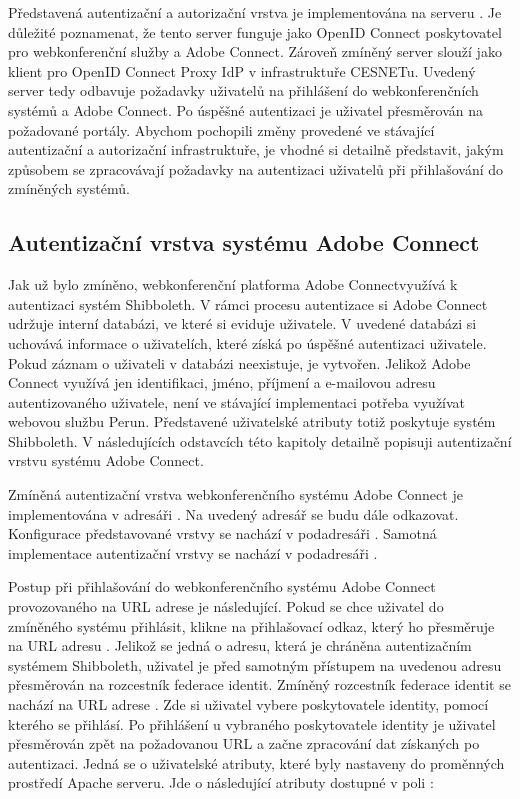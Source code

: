 \documentclass[
  printed, %
  twoside, %
  table,   %
  nolof,     %
  nolot,     %
]{fithesis3}
\begin{document}
Představená autentizační a autorizační vrstva je implementována na serveru . Je důležité poznamenat, že tento server funguje jako OpenID Connect poskytovatel pro webkonferenční služby  a Adobe Connect. Zároveň zmíněný server slouží jako klient pro OpenID Connect Proxy IdP v infrastruktuře CESNETu. Uvedený server tedy odbavuje požadavky uživatelů na přihlášení do webkonferenčních systémů  a Adobe Connect. Po úspěšné autentizaci je uživatel přesměrován na požadované portály. Abychom pochopili změny provedené ve stávající autentizační a autorizační infrastruktuře, je vhodné si detailně představit, jakým způsobem se zpracovávají požadavky na autentizaci uživatelů při přihlašování do zmíněných systémů.  

\subsection{Autentizační vrstva systému Adobe Connect}
\label{ac-old}
Jak už bylo zmíněno, webkonferenční platforma Adobe Connect\break využívá k autentizaci systém Shibboleth. V rámci procesu autentizace si Adobe Connect udržuje interní databázi, ve které si eviduje uživatele. V uvedené databázi si uchovává informace o uživatelích,
které získá po úspěšné autentizaci uživatele. Pokud záznam o uživateli
v databázi neexistuje, je vytvořen. Jelikož Adobe Connect využívá jen
identifikaci, jméno, příjmení a e-mailovou adresu autentizovaného uživatele, není ve stávající implementaci
potřeba využívat webovou službu Perun. Představené uživatelské atributy totiž poskytuje systém Shibboleth. V následujících odstavcích této kapitoly detailně popisuji autentizační vrstvu systému Adobe Connect. \par

Zmíněná autentizační vrstva webkonferenčního systému Adobe Connect je implementována v adresáři . Na uvedený adresář se budu dále odkazovat. Konfigurace představované vrstvy se nachází v podadresáři . Samotná implementace autentizační vrstvy se nachází v podadresáři . \par

Postup při přihlašování do webkonferenčního systému Adobe Connect provozovaného na URL adrese  je následující. Pokud se chce uživatel do zmíněného systému přihlásit, klikne na přihlašovací odkaz, který ho přesměruje na URL adresu . Jelikož se jedná o adresu, která je chráněna autentizačním systémem Shibboleth, uživatel je před samotným přístupem na uvedenou adresu přesměrován na rozcestník federace identit. Zmíněný rozcestník federace identit se nachází na URL adrese . Zde si uživatel vybere poskytovatele identity, pomocí kterého se přihlásí. Po přihlášení u vybraného poskytovatele identity je uživatel  přesměrován zpět na požadovanou URL  a začne zpracování dat získaných po autentizaci. Jedná se o uživatelské atributy, které byly nastaveny do proměnných prostředí Apache serveru. Jde o následující atributy dostupné v poli : 
\end{document}
